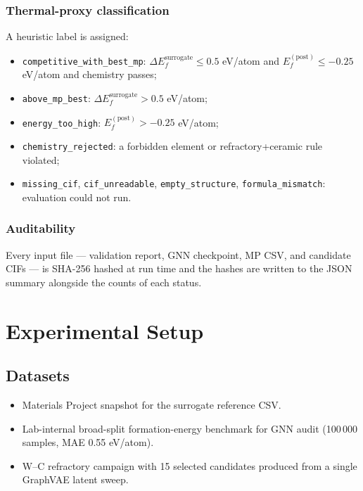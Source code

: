 \documentclass[11pt,a4paper]{article}
\begin{document}
\subsubsection{Thermal-proxy classification}
A heuristic label is assigned:
\begin{itemize}[noitemsep]
  \item \texttt{competitive\_with\_best\_mp}: $\Delta E_f^{\mathrm{surrogate}}\le 0.5$ eV/atom
        and $E_f^{(\mathrm{post})}\le -0.25$ eV/atom
        and chemistry passes;
  \item \texttt{above\_mp\_best}: $\Delta E_f^{\mathrm{surrogate}} > 0.5$ eV/atom;
  \item \texttt{energy\_too\_high}: $E_f^{(\mathrm{post})} > -0.25$ eV/atom;
  \item \texttt{chemistry\_rejected}: a forbidden element or refractory+ceramic rule violated;
  \item \texttt{missing\_cif}, \texttt{cif\_unreadable}, \texttt{empty\_structure},
        \texttt{formula\_mismatch}: evaluation could not run.
\end{itemize}

\subsubsection{Auditability}
Every input file --- validation report, GNN checkpoint, MP CSV, and
candidate CIFs --- is SHA-256 hashed at run time and the hashes are
written to the JSON summary alongside the counts of each status.

\section{Experimental Setup}
\label{sec:setup}

\subsection{Datasets}
\begin{itemize}[noitemsep]
  \item Materials Project snapshot for the surrogate reference CSV.
  \item Lab-internal broad-split formation-energy benchmark for GNN
        audit (100\,000 samples, MAE 0.55 eV/atom).
  \item W--C refractory campaign with 15 selected candidates produced
        from a single GraphVAE latent sweep.
\end{itemize}
\end{document}
